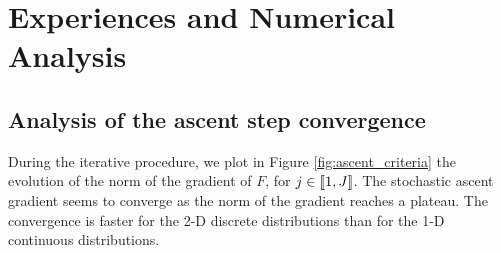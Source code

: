 \section{Experiences and Numerical Analysis}

\subsection{Analysis of the ascent step convergence}
\label{sec:ascent_convergence}
 During the iterative procedure, we plot in Figure \ref{fig:ascent_criteria} the evolution of the norm of the gradient of $F$, for $j \in [\![ 1, J ]\!]$. The stochastic ascent gradient seems to converge as the norm of the gradient reaches a plateau. The convergence is faster for the 2-D discrete distributions than for the 1-D continuous distributions. 


